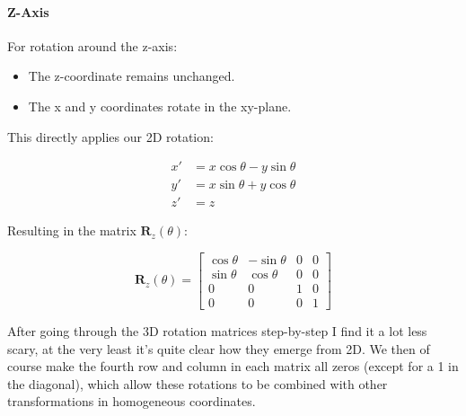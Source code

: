 \documentclass[12pt]{article}
\begin{document}
\paragraph{Z-Axis} For rotation around the z-axis:
\begin{itemize}
    \item The z-coordinate remains unchanged.
    \item The x and y coordinates rotate in the xy-plane.
\end{itemize}

This directly applies our 2D rotation:

$$
    \begin{aligned}
        x' & = x \cos\theta - y \sin\theta \\
        y' & = x \sin\theta + y \cos\theta \\
        z' & = z
    \end{aligned}
$$

Resulting in the matrix $\mathbf{R}_z(\theta)$:

$$
    \mathbf{R}_z(\theta) = \begin{bmatrix}
        \cos\theta & -\sin\theta & 0 & 0 \\
        \sin\theta & \cos\theta  & 0 & 0 \\
        0          & 0           & 1 & 0 \\
        0          & 0           & 0 & 1
    \end{bmatrix}
$$

After going through the 3D rotation matrices step-by-step I find it a lot less scary, at the very least it's quite clear how they emerge from 2D.
We then of course make the fourth row and column in each matrix all zeros (except for a 1 in the diagonal), which allow these rotations to be combined with other transformations in homogeneous coordinates.
\end{document}
